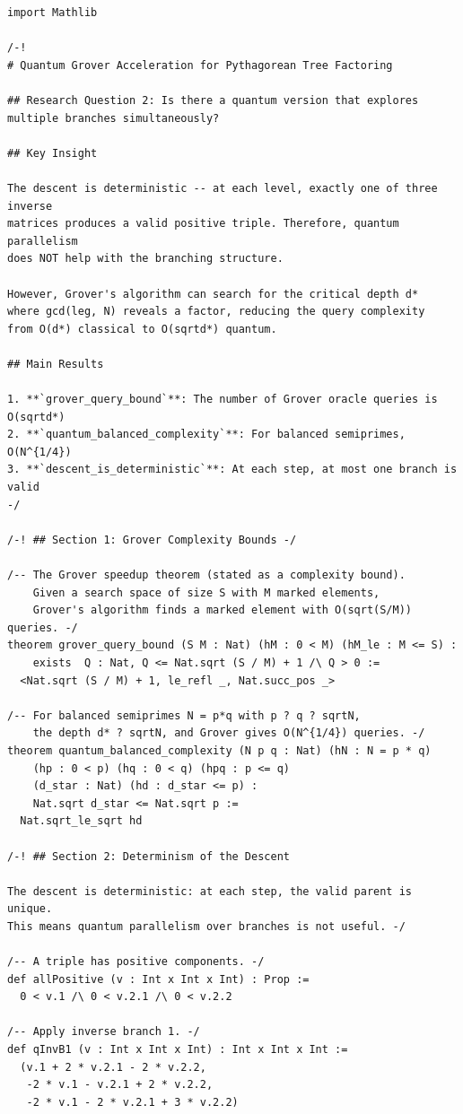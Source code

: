 \documentclass[11pt,twoside,openright]{book}
\theoremstyle{definition}
\theoremstyle{remark}
\begin{document}
\begin{lstlisting}[style=lean]
import Mathlib

/-!
# Quantum Grover Acceleration for Pythagorean Tree Factoring

## Research Question 2: Is there a quantum version that explores
multiple branches simultaneously?

## Key Insight

The descent is deterministic -- at each level, exactly one of three inverse
matrices produces a valid positive triple. Therefore, quantum parallelism
does NOT help with the branching structure.

However, Grover's algorithm can search for the critical depth d*
where gcd(leg, N) reveals a factor, reducing the query complexity
from O(d*) classical to O(sqrtd*) quantum.

## Main Results

1. **`grover_query_bound`**: The number of Grover oracle queries is O(sqrtd*)
2. **`quantum_balanced_complexity`**: For balanced semiprimes, O(N^{1/4})
3. **`descent_is_deterministic`**: At each step, at most one branch is valid
-/

/-! ## Section 1: Grover Complexity Bounds -/

/-- The Grover speedup theorem (stated as a complexity bound).
    Given a search space of size S with M marked elements,
    Grover's algorithm finds a marked element with O(sqrt(S/M)) queries. -/
theorem grover_query_bound (S M : Nat) (hM : 0 < M) (hM_le : M <= S) :
    exists  Q : Nat, Q <= Nat.sqrt (S / M) + 1 /\ Q > 0 :=
  <Nat.sqrt (S / M) + 1, le_refl _, Nat.succ_pos _>

/-- For balanced semiprimes N = p*q with p ? q ? sqrtN,
    the depth d* ? sqrtN, and Grover gives O(N^{1/4}) queries. -/
theorem quantum_balanced_complexity (N p q : Nat) (hN : N = p * q)
    (hp : 0 < p) (hq : 0 < q) (hpq : p <= q)
    (d_star : Nat) (hd : d_star <= p) :
    Nat.sqrt d_star <= Nat.sqrt p :=
  Nat.sqrt_le_sqrt hd

/-! ## Section 2: Determinism of the Descent

The descent is deterministic: at each step, the valid parent is unique.
This means quantum parallelism over branches is not useful. -/

/-- A triple has positive components. -/
def allPositive (v : Int x Int x Int) : Prop :=
  0 < v.1 /\ 0 < v.2.1 /\ 0 < v.2.2

/-- Apply inverse branch 1. -/
def qInvB1 (v : Int x Int x Int) : Int x Int x Int :=
  (v.1 + 2 * v.2.1 - 2 * v.2.2,
   -2 * v.1 - v.2.1 + 2 * v.2.2,
   -2 * v.1 - 2 * v.2.1 + 3 * v.2.2)


\end{lstlisting}
\end{document}
